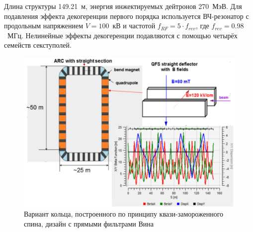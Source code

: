 Длина структуры 149.21~м, энергия инжектируемых дейтронов 270~МэВ. 
Для подавления эффекта декогеренции первого порядка используется ВЧ-резонатор 
с продольным напряжением ${V = 100}$~кВ и частотой ${f_{RF} = 5\cdot f_{rev}}$, 
где ${f_{rev} = 0.98}$~МГц. Нелинейные эффекты декогеренции подавляются с помощью 
четырёх семейств секступолей.
\begin{figure}[H]
	\centering
	\includegraphics[width=\linewidth]{images/chapter2/E+B_lattice}
	\caption{Вариант кольца, построенного по принципу квази-замороженного спина, 
		дизайн с прямыми фильтрами Вина
	\label{fig:QFS_E+B_lattice}}
\end{figure}

